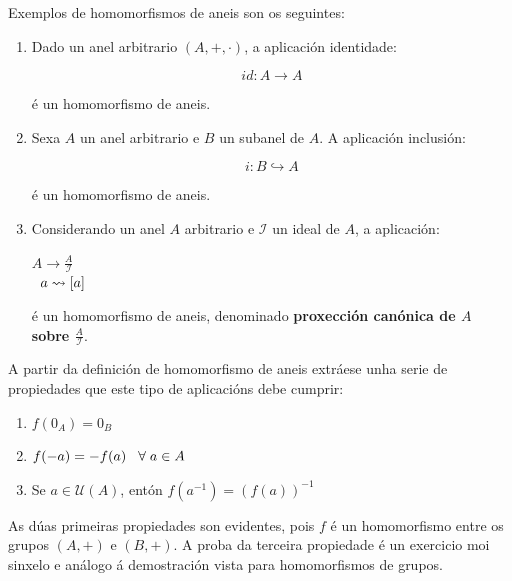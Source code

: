 \documentclass[twoside]{report}
\theoremstyle{mystyle}
\begin{document}
\noindent Exemplos de homomorfismos de aneis son os seguintes:\\

\begin{enumerate}
    \item Dado un anel arbitrario $(A, +, \cdot)$, a aplicación identidade:
    
        $$ id: A \longrightarrow A $$
        
        é un homomorfismo de aneis.
        
    \item Sexa $A$ un anel arbitrario e $B$ un subanel de $A$. A aplicación inclusión:
    
        $$ i: B \hookrightarrow A $$
        
        é un homomorfismo de aneis.
        
    \item Considerando un anel $A$ arbitrario e $\mathcal{I}$ un ideal de $A$, a aplicación:
    
        \begin{center}
            $A \longrightarrow \displaystyle \frac{A}{\mathcal{I}}$\\
            \vspace{2mm}
            $\hspace{2mm} a \leadsto [a]$
        \end{center}
        
        é un homomorfismo de aneis, denominado \textbf{proxección canónica de $A$ sobre $\displaystyle \frac{A}{\mathcal{I}}$}.\\
    
\end{enumerate}

\noindent A partir da definición de homomorfismo de aneis extráese unha serie de propiedades que este tipo de aplicacións debe cumprir:

\begin{enumerate}
    \item $f(0_{A}) = 0_{B}$
    \item $f(-a) = -f(a) \hspace{3mm} \forall \hspace{1mm} a \in A$
    \item Se $a \in \mathcal{U}(A)$, entón $f(a^{-1}) = (f(a))^{-1}$
\end{enumerate}

\noindent As dúas primeiras propiedades son evidentes, pois $f$ é un homomorfismo entre os grupos $(A,+)$ e $(B,+)$. A proba da terceira propiedade é un exercicio moi sinxelo e análogo á demostración vista para homomorfismos de grupos.
\end{document}
